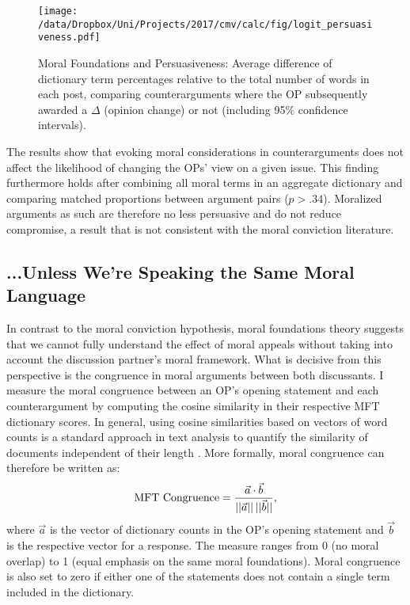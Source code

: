 \begin{figure}[ht]
\centering
\texttt{[image: /data/Dropbox/Uni/Projects/2017/cmv/calc/fig/logit\_persuasiveness.pdf]}
\caption[Moral Foundations and Persuasiveness]{Moral Foundations and Persuasiveness: Average difference of dictionary term percentages relative to the total number of words in each post, comparing counterarguments where the OP subsequently awarded a $\Delta$ (opinion change) or not (including 95\% confidence intervals).}\label{fig:persuasiveness}
\end{figure}

The results show that evoking moral considerations in counterarguments does not affect the likelihood of changing the OPs' view on a given issue. This finding furthermore holds after combining all moral terms in an aggregate dictionary and comparing matched proportions between argument pairs ($p > .34$). Moralized arguments as such are therefore no less persuasive and do not reduce compromise, a result that is not consistent with the moral conviction literature.



\subsection{...Unless We're Speaking the Same Moral Language}

In contrast to the moral conviction hypothesis, moral foundations theory suggests that we cannot fully understand the effect of moral appeals without taking into account the discussion partner's moral framework.  What is decisive from this perspective is the congruence in moral arguments between both discussants. I measure the moral congruence between an OP's opening statement and each counterargument by computing the cosine similarity in their respective MFT dictionary scores. In general, using cosine similarities based on vectors of word counts is a standard approach in text analysis to quantify the similarity of documents independent of their length \citep[e.g.,][]{manning2008introduction}. More formally, moral congruence can therefore be written as:
\begin{equation}
\text{MFT Congruence}=\dfrac{\vec{a}\cdot \vec{b}}{||\vec{a}||\hspace{.2em}||\vec{b}||},
\end{equation}
where $\vec{a}$ is the vector of dictionary counts in the OP's opening statement and $\vec{b}$ is the respective vector for a response. The measure ranges from 0 (no moral overlap) to 1 (equal emphasis on the same moral foundations). Moral congruence is also set to zero if either one of the statements does not contain a single term included in the dictionary.

